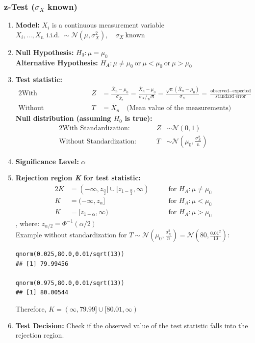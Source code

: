 \documentclass[11pt]{article}
\newcommand*\samplemean[1]{\overline{#1}}
\newcommand*\N[1]{\mathcal{N}\left(#1\right)}
\begin{document}
\subsubsection{z-Test ($\sigma_X$ known)}

\begin{enumerate}[label=\textbf{\arabic*})] %
	\item \textbf{Model:} $X_i$ is a continuous measurement variable $ X_i, \dots, X_n \text{ i.i.d. } \sim \N{\mu, \sigma_X^2}, \quad \sigma_X\ \text{known}$
	\item \textbf{Null Hypothesis:} $H_0: \mu = \mu_0$\\ \textbf{Alternative Hypothesis:} $H_A: \mu \neq \mu_0\ \text{or}\ \mu < \mu_0\ \text{or}\ \mu > \mu_0$
	\item \textbf{Test statistic:}
	\begin{alignat*}{2}
		\text{With Standardization: }&& \quad Z &= \frac{\samplemean{X}_n - \mu_0}{\sigma_{\samplemean{X}_n}} = \frac{\samplemean{X}_n - \mu_0}{\sigma_X / \sqrt{n}} = \frac{\sqrt{n}\left(\samplemean{X}_n - \mu_0\right)}{\sigma_X} =\frac{\text{observed} - \text{expected}}{\text{standard error}}\\
		\text{Without Standardization: }&& \quad T &=\samplemean{X}_n \quad \text{(Mean value of the measurements)}
	\end{alignat*}
	\textbf{Null distribution (assuming $H_0$ is true):}
	\begin{alignat*}{2}
		\text{With Standardization: }&& \quad Z &\sim \N{0,1}\\
		\text{Without Standardization: }&& \quad T &\sim \N{\mu_0,\frac{\sigma^2_X}{n}}
	\end{alignat*}
	\item \textbf{Significance Level:} $\alpha$
	\item \textbf{Rejection region \textit{K} for test statistic:}
	\begin{alignat*}{2}
		K &= (-\infty,z_{\frac{\alpha}{2}}] \cup [z_{1-\frac{\alpha}{2}}, \infty) &\qquad \text{for } H_A : \mu\neq \mu_0\\
		K &= (-\infty, z_\alpha] &\qquad \text{for } H_A : \mu < \mu_0\\
		K &= [ z_{1-\alpha}, \infty ) &\qquad \text{for } H_A : \mu > \mu_0
	\end{alignat*}
	, where: $z_{\alpha/2} = \Phi^{-1}(\alpha / 2)$\\
	Example without standardization for $T \sim \N{\mu_0,\frac{\sigma^2_X}{n}} = \N{80,\frac{0.01^2}{13}}$:
\begin{verbatim}
qnorm(0.025,80.0,0.01/sqrt(13))
## [1] 79.99456

qnorm(0.975,80.0,0.01/sqrt(13))
## [1] 80.00544
\end{verbatim}
	Therefore, $K = (\infty, 79.99] \cup [80.01, \infty)$
	\item \textbf{Test Decision:} Check if the observed value of the test statistic falls into the rejection region.
\end{enumerate}
\end{document}
